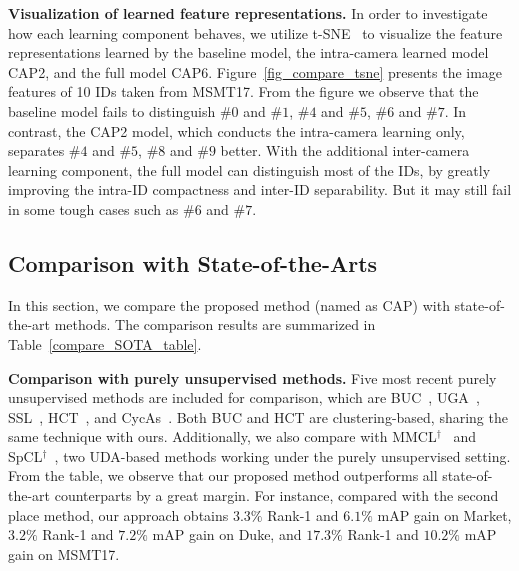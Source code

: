 \documentclass[letterpaper]{article} %
\begin{document}
\textbf{Visualization of learned feature representations.} In order to investigate how each learning component behaves, we utilize t-SNE~\cite{vanDerMaaten2008} to visualize the feature representations learned by the baseline model, the intra-camera learned model CAP2, and the full model CAP6. Figure~\ref{fig_compare_tsne} presents the image features of 10 IDs taken from MSMT17. From the figure we observe that the baseline model fails to distinguish $\#0$ and $\#1$, $\#4$ and $\#5$,  $\#6$ and $\#7$. In contrast, the CAP2 model, which conducts the intra-camera learning only, separates $\#4$ and $\#5$, $\#8$ and $\#9$ better. %
With the additional inter-camera learning component, the full model can distinguish most of the IDs, by greatly improving the intra-ID compactness and inter-ID separability. But it may still fail in some tough cases such as $\#6$ and $\#7$.



\subsection{Comparison with State-of-the-Arts}
In this section, we compare the proposed method (named as CAP) with state-of-the-art methods. The comparison results are summarized in Table~\ref{compare_SOTA_table}.

\textbf{Comparison with purely unsupervised methods.} Five most recent purely unsupervised methods are included for comparison, which are BUC~\cite{lin2019aBottom}, UGA~\cite{wu2019graph}, SSL~\cite{lin2020unsupervised}, HCT~\cite{zeng2020hierarchical}, and CycAs~\cite{wang2020cycas}. Both BUC and HCT are clustering-based, sharing the same technique with ours. Additionally, we also compare with MMCL$^\dagger$~\cite{wang2020unsupervised} and SpCL$^\dagger$~\cite{ge2020self}, two UDA-based methods working under the purely unsupervised setting. From the table, we observe that our proposed method outperforms all state-of-the-art counterparts by a great margin. For instance, compared with the second place method, our approach obtains $3.3\%$ Rank-1 and $6.1\%$ mAP gain on Market, $3.2\%$ Rank-1 and $7.2\%$ mAP gain on Duke, and $17.3\%$ Rank-1 and $10.2\%$ mAP gain on MSMT17.
\end{document}
